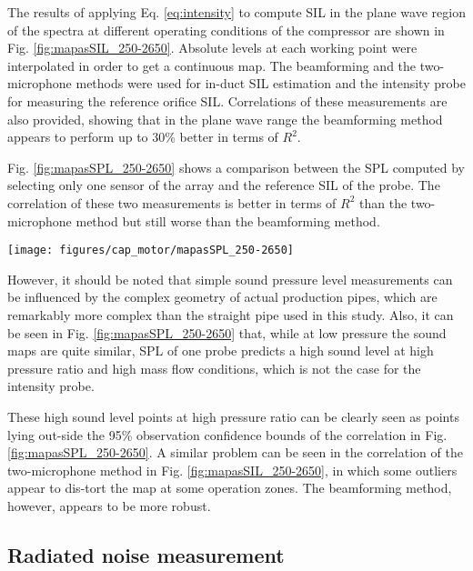 The results of applying Eq. \ref{eq:intensity} to compute SIL in the plane wave region of the spectra at different operating conditions of the compressor are shown in Fig. \ref{fig:mapasSIL_250-2650}. Absolute levels at each working point were interpolated in order to get a continuous map. The beamforming and the two-microphone methods were used for in-duct SIL estimation and the intensity probe for measuring the reference orifice SIL. Correlations of these measurements are also provided, showing that in the plane wave range the beamforming method appears to perform up to 30\% better in terms of $R^2$.

Fig. \ref{fig:mapasSPL_250-2650} shows a comparison between the SPL computed by selecting only one sensor of the array and the reference SIL of the probe. The correlation of these two measurements is better in terms of $R^2$ than the two-microphone method but still worse than the beamforming method.

\begin{figure*}[tb!]
\centering
\texttt{[image: figures/cap\_motor/mapasSPL\_250-2650]}
\caption{Comparison of compressor sound maps (plane wave region) obtained through interpolation of SPL at the inlet 1st sensor and SIL at the probe, including a correlation between both.}
\label{fig:mapasSPL_250-2650}
\end{figure*}

However, it should be noted that simple sound pressure level measurements can be influenced by the complex geometry of actual production pipes, which are remarkably more complex than the straight pipe used in this study. Also, it can be seen in Fig. \ref{fig:mapasSPL_250-2650} that, while at low pressure the sound maps are quite similar, SPL of one probe predicts a high sound level at high pressure ratio and high mass flow conditions, which is not the case for the intensity probe.

These high sound level points at high pressure ratio can be clearly seen as points lying out-side the 95\% observation confidence bounds of the correlation in Fig. \ref{fig:mapasSPL_250-2650}. A similar problem can be seen in the correlation of the two-microphone method in Fig. \ref{fig:mapasSIL_250-2650}, in which some outliers appear to dis-tort the map at some operation zones. The beamforming method, however, appears to be more robust.

\subsection{Radiated noise measurement}
\label{sub:radiated_noise_measurement}

